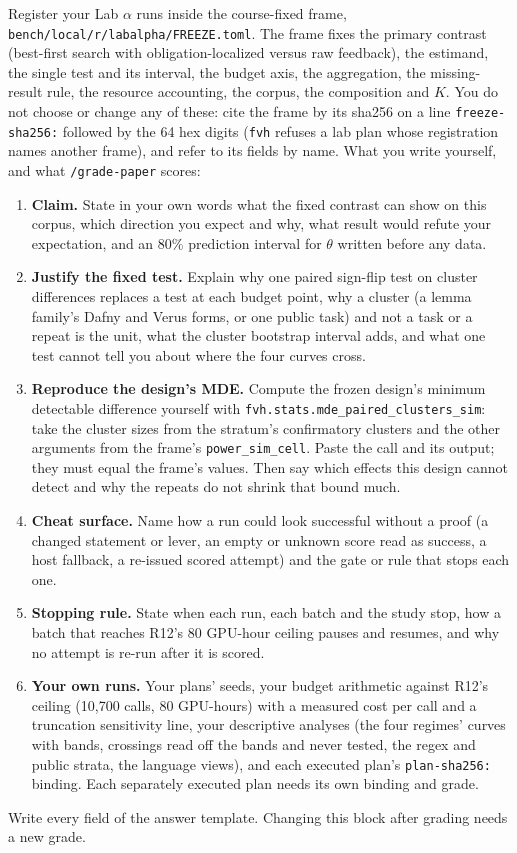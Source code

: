 \documentclass[11pt]{article}
\begin{document}
\begin{problem}\label{prob:B1}
Register your Lab $\alpha$ runs inside the course-fixed frame,
\texttt{bench/local/r/labalpha/FREEZE.toml}. The frame fixes the primary contrast
(best-first search with obligation-localized versus raw feedback), the estimand,
the single test and its interval, the budget axis, the aggregation, the
missing-result rule, the resource accounting, the corpus, the composition and
$K$. You do not choose or change any of these: cite the frame by its sha256 on a
line \texttt{freeze-sha256:} followed by the 64 hex digits (\texttt{fvh} refuses a
lab plan whose registration names another frame), and refer to its fields by
name. What you write yourself, and what \texttt{/grade-paper} scores:

\begin{enumerate}
\item \textbf{Claim.} State in your own words what the fixed contrast can show
on this corpus, which direction you expect and why, what result would refute
your expectation, and an 80\% prediction interval for $\theta$ written before
any data.
\item \textbf{Justify the fixed test.} Explain why one paired sign-flip test on
cluster differences replaces a test at each budget point, why a cluster (a
lemma family's Dafny and Verus forms, or one public task) and not a task or a
repeat is the unit, what the cluster bootstrap interval adds, and what one
test cannot tell you about where the four curves cross.
\item \textbf{Reproduce the design's MDE.} Compute the frozen design's minimum
detectable difference yourself with \texttt{fvh.stats.mde\_paired\_clusters\_sim}:
take the cluster sizes from the stratum's confirmatory clusters and the other
arguments from the frame's \texttt{power\_sim\_cell}. Paste the call and its
output; they must equal the frame's values. Then say which effects this design
cannot detect and why the repeats do not shrink that bound much.
\item \textbf{Cheat surface.} Name how a run could look successful without a
proof (a changed statement or lever, an empty or unknown score read as success,
a host fallback, a re-issued scored attempt) and the gate or rule that stops
each one.
\item \textbf{Stopping rule.} State when each run, each batch and the study stop,
how a batch that reaches R12's 80 GPU-hour ceiling pauses and resumes, and why
no attempt is re-run after it is scored.
\item \textbf{Your own runs.} Your plans' seeds, your budget arithmetic against
R12's ceiling (10,700 calls, 80 GPU-hours) with a measured cost per call and a
truncation sensitivity line, your descriptive analyses (the four regimes'
curves with bands, crossings read off the bands and never tested, the regex and
public strata, the language views), and each executed plan's
\texttt{plan-sha256:} binding. Each separately executed plan needs its own
binding and grade.
\end{enumerate}
Write every field of the answer template. Changing this block after grading
needs a new grade.
\end{problem}
\end{document}
